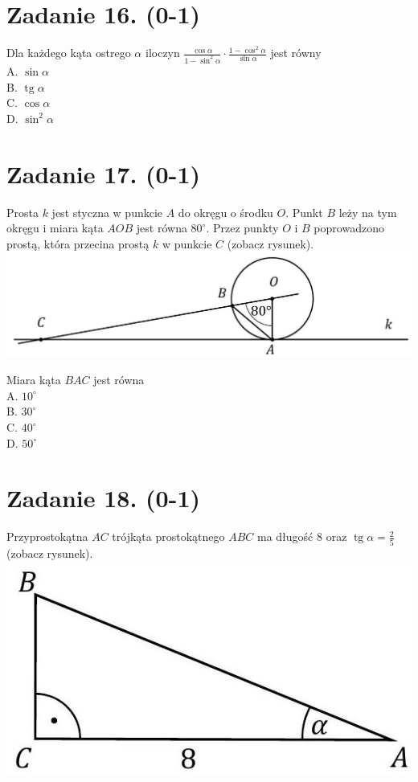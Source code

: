 \documentclass[10pt]{article}
\begin{document}
\section*{Zadanie 16. (0-1)}
Dla każdego kąta ostrego \(\alpha\) iloczyn \(\frac{\cos \alpha}{1-\sin ^{2} \alpha} \cdot \frac{1-\cos ^{2} \alpha}{\sin \alpha}\) jest równy\\
A. \(\sin \alpha\)\\
B. \(\operatorname{tg} \alpha\)\\
C. \(\cos \alpha\)\\
D. \(\sin ^{2} \alpha\)

\section*{Zadanie 17. (0-1)}
Prosta \(k\) jest styczna w punkcie \(A\) do okręgu o środku \(O\). Punkt \(B\) leży na tym okręgu i miara kąta \(A O B\) jest równa \(80^{\circ}\). Przez punkty \(O\) i \(B\) poprowadzono prostą, która przecina prostą \(k\) w punkcie \(C\) (zobacz rysunek).\\
\includegraphics[max width=\textwidth, center]{2024_11_21_46d945490f1b2eff1c8eg-08(1)}

Miara kąta \(B A C\) jest równa\\
A. \(10^{\circ}\)\\
B. \(30^{\circ}\)\\
C. \(40^{\circ}\)\\
D. \(50^{\circ}\)

\section*{Zadanie 18. (0-1)}
Przyprostokątna \(A C\) trójkąta prostokątnego \(A B C\) ma długość 8 oraz \(\operatorname{tg} \alpha=\frac{2}{5}\) (zobacz rysunek).\\
\includegraphics[max width=\textwidth, center]{2024_11_21_46d945490f1b2eff1c8eg-08}
\end{document}
